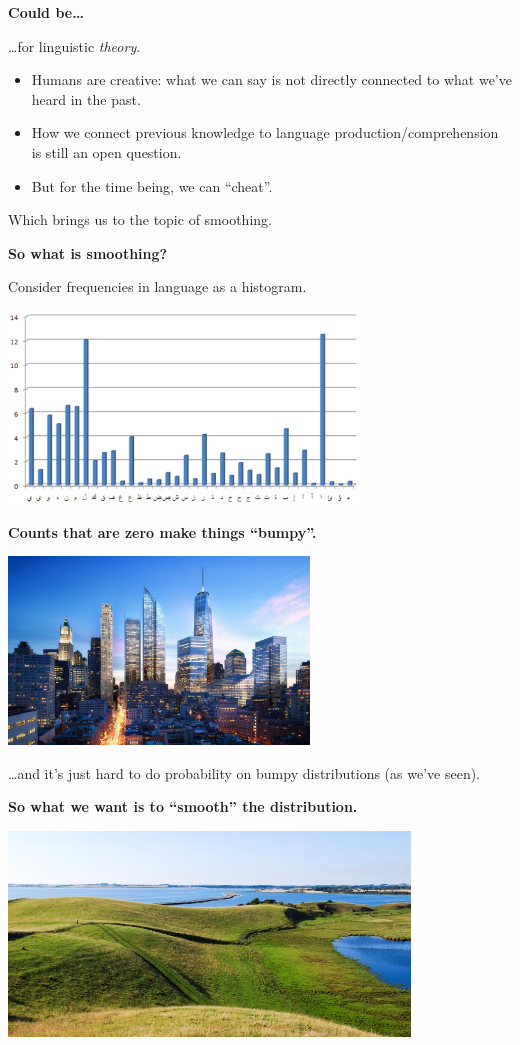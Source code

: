 \documentclass{beamer}
\newcommand{\pagestepalt}[2]{
  \begin{frame}[t]
    \begin{minipage}[t][0.26\textheight][t]{\textwidth}
      \begin{center}
        \huge
        \textbf{#1}
      \end{center}
    \end{minipage}
    
    \begin{minipage}[t][0.7\textheight][t]{\textwidth}
      #2
    \end{minipage}
  \end{frame}
}
\begin{document}
\pagestepalt{Could be\ldots}{
  \pause \ldots for linguistic {\it theory}.\pause 
  \begin{itemize}
  \item Humans are creative: what we can say is not directly connected
    to what we've heard in the past.\pause
  \item How we connect previous knowledge to language
    production/comprehension is still an open question.\pause
  \item But for the time being, we can ``cheat''.\pause
  \end{itemize}
  Which brings us to the topic of \alert{smoothing}.
}


\pagestepalt{So what is smoothing?}{
  Consider frequencies in language as a histogram.
  \begin{center}
    \includegraphics[width=0.7\textwidth]{images/histo.png}
  \end{center}
}

\pagestepalt{Counts that are zero make things ``bumpy''.}{
  \begin{center}
    \includegraphics[width=0.6\textwidth]{images/cityskyline.jpg}
  \end{center}
  \ldots and it's just hard to do probability on bumpy distributions (as we've seen).
}

\pagestepalt{So what we want is to ``smooth'' the distribution.}{
  \begin{center}
    \includegraphics[width=0.8\textwidth]{images/hills.jpg}
  \end{center}
}
\end{document}
